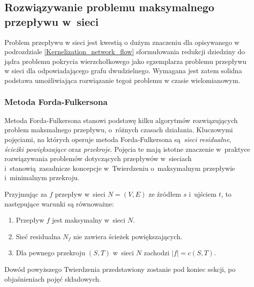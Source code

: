 \subsection{Rozwiązywanie problemu maksymalnego przepływu w~sieci}\label{ss_max_flow}
\par{
  Problem przepływu w sieci jest kwestią o dużym znaczeniu dla opisywanego w podrozdziale \ref{Kernelization_network_flow} sformułowania redukcji dziedziny do jądra problemu pokrycia wierzchołkowego jako egzemplarza problemu przepływu w sieci dla odpowiadającego grafu dwudzielnego. 
  Wymagana jest zatem solidna podstawa umożliwiająca rozwiązanie tegoż problemu w czasie wielomianowym.
}
\subsubsection{\textbf{Metoda Forda-Fulkersona}}
\par{
  Metoda Forda-Fulkersona stanowi podstawę kilku algorytmów rozwiązujących problem maksmalnego przepływu, o~różnych czasach działania.
  Kluczowymi pojęciami, na których operuje metoda Forda-Fulkersona są \emph{sieci residualne}, \emph{ścieżki powiększające} oraz \emph{przekroje}.
  Pojęcia te mają istotne znaczenie w~praktyce rozwiązywania problemów dotyczących przepływów w~sieciach i~stanowią zasadnicze koncepcje w~Twierdzeniu o~maksymalnym przepływie i~minimalnym przekroju.
  \begin{theorem}
    Przyjmując za $f$ przepływ w~sieci $N=(V,E)$ ze źródłem $s$ i~ujściem $t$, to następujące warunki są równoważne:
    \begin{enumerate}
      \item Przepływ $f$ jest maksymalny w~sieci $N$.
      \item Sieć residualna $N_f$ nie zawiera ścieżek powiększających.
      \item Dla pewnego przekroju $(S, T)$ w~sieci $N$ zachodzi $|f|=c(S,T)$.
    \end{enumerate}
  \end{theorem}
  Dowód powyższego Twierdzenia przedstawiony zostanie pod koniec sekcji, po objaśnieniach pojęć składowych.
}
